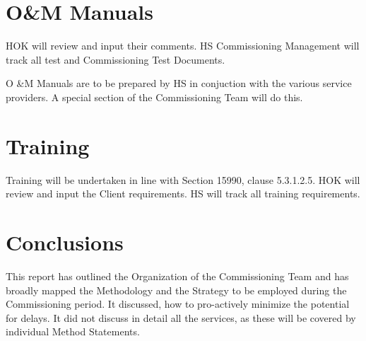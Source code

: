 \chapter{O\&M Manuals}

HOK will review and input their comments. HS Commissioning Management will track all test and Commissioning Test Documents.

O \&M Manuals are to be prepared by HS in conjuction with the various service providers. A special section of the Commissioning Team will do this.

\chapter{Training}

Training will be undertaken in line with Section 15990, clause 5.3.1.2.5. HOK will review and input the Client requirements. HS will track all training requirements.


\chapter{Conclusions}

This report has outlined the Organization of the Commissioning Team and has broadly mapped the Methodology and the Strategy to be employed during the Commissioning period. It discussed, how to pro-actively minimize the potential for delays. It did not discuss in detail all the services, as these will be covered by individual Method Statements.




































